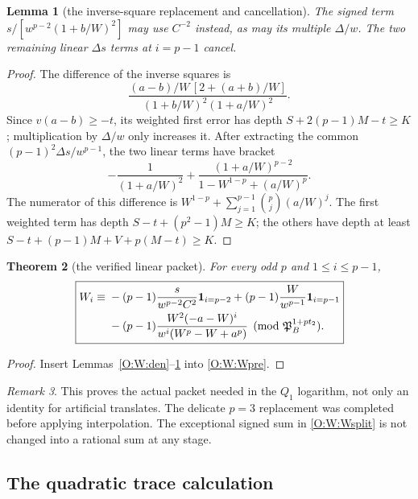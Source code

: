 \documentclass[11pt]{amsart}
\newtheorem{theorem}{Theorem}[section]
\newtheorem{lemma}[theorem]{Lemma}
\theoremstyle{definition}
\theoremstyle{remark}
\newtheorem{remark}[theorem]{Remark}
\begin{document}
\begin{lemma}[the inverse-square replacement and cancellation]\label{O:W:cancel}
The signed term $s/[w^{p-2}(1+b/W)^2]$ may use $C^{-2}$ instead,
as may its multiple $\Delta/w$. The two remaining linear
$\Delta s$ terms at $i=p-1$ cancel.
\end{lemma}
\begin{proof}
The difference of the inverse squares is
\[
 \frac{(a-b)/W\,[2+(a+b)/W]}{(1+b/W)^2(1+a/W)^2}.
\]
Since $v(a-b)\ge-t$, its weighted first error has depth
$S+2(p-1)M-t\ge K$; multiplication by $\Delta/w$ only increases it.
After extracting the common $(p-1)^2\Delta s/w^{p-1}$, the two
linear terms have bracket
\[
 -\frac1{(1+a/W)^2}
 +\frac{(1+a/W)^{p-2}}{1-W^{1-p}+(a/W)^p}.
\]
The numerator of this difference is
$W^{1-p}+\sum_{j=1}^{p-1}\binom pj(a/W)^j$.
The first weighted term has depth $S-t+(p^2-1)M\ge K$;
the others have depth at least
$S-t+(p-1)M+V+p(M-t)\ge K$.
\end{proof}

\begin{theorem}[the verified linear packet]\label{O:W:final}
For every odd $p$ and $1\le i\le p-1$,
\[
 \boxed{\begin{aligned}
 W_i\equiv{}&
 -(p-1)\frac{s}{w^{p-2}C^2}\mathbf1_{i=p-2}
 +(p-1)\frac{W}{w^{p-1}}\mathbf1_{i=p-1}\\
 &-(p-1)\frac{W^2(-a-W)^i}{w^i(W^p-W+a^p)}
 \pmod{\mathfrak P_B^{1+pt_2}}.
 \end{aligned}}
\]
\end{theorem}
\begin{proof}
Insert Lemmas~\ref{O:W:den}--\ref{O:W:cancel} into \eqref{O:W:Wpre}.
\end{proof}
\begin{remark}
This proves the actual packet needed in the $Q_1$ logarithm, not only
an identity for artificial translates. The delicate $p=3$ replacement
was completed before applying interpolation. The exceptional signed
sum in \eqref{O:W:Wsplit} is not changed into a rational sum at any stage.
\end{remark}


\subsection{The quadratic trace calculation}\label{O:sec:quadratic}
\end{document}
